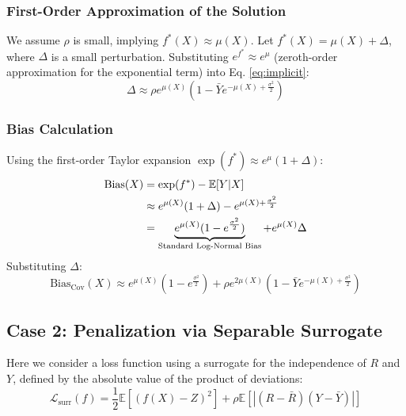 \documentclass[11pt]{article}
\theoremstyle{plain}
\theoremstyle{definition}
\newcommand{\1}{\mathbf{1}}
\begin{document}
\subsubsection{First-Order Approximation of the Solution}
We assume $\rho$ is small, implying $f^*(X) \approx \mu(X)$. Let $f^*(X) = \mu(X) + \Delta$, where $\Delta$ is a small perturbation.
Substituting $e^{f^*} \approx e^{\mu}$ (zeroth-order approximation for the exponential term) into Eq. \eqref{eq:implicit}:
\begin{equation}
    \Delta \approx \rho e^{\mu(X)} \left( 1 - \bar{Y} e^{-\mu(X) + \frac{\sigma^2}{2}} \right)
\end{equation}

\subsubsection{Bias Calculation}
Using the first-order Taylor expansion $\exp(f^*) \approx e^{\mu}(1 + \Delta)$:
\begin{align}
    \text{Bias}(X) &= \exp(f^*) - \mathbb{E}[Y|X] \notag \\
    &\approx e^{\mu(X)}(1 + \Delta) - e^{\mu(X) + \frac{\sigma^2}{2}} \notag \\
    &= \underbrace{e^{\mu(X)}(1 - e^{\frac{\sigma^2}{2}})}_{\text{Standard Log-Normal Bias}} + e^{\mu(X)}\Delta
\end{align}
Substituting $\Delta$:
\begin{equation}
    \text{Bias}_{\text{Cov}}(X) \approx e^{\mu(X)}\left(1 - e^{\frac{\sigma^2}{2}}\right) + \rho e^{2\mu(X)} \left( 1 - \bar{Y} e^{-\mu(X) + \frac{\sigma^2}{2}} \right)
\end{equation}

\subsection{Case 2: Penalization via Separable Surrogate}

Here we consider a loss function using a surrogate for the independence of $R$ and $Y$, defined by the absolute value of the product of deviations:
\begin{equation}
    \mathcal{L}_{\text{surr}}(f) = \frac{1}{2}\mathbb{E}[(f(X) - Z)^2] + \rho \mathbb{E}[ | (R - \bar{R})(Y - \bar{Y}) | ]
\end{equation}
\end{document}
